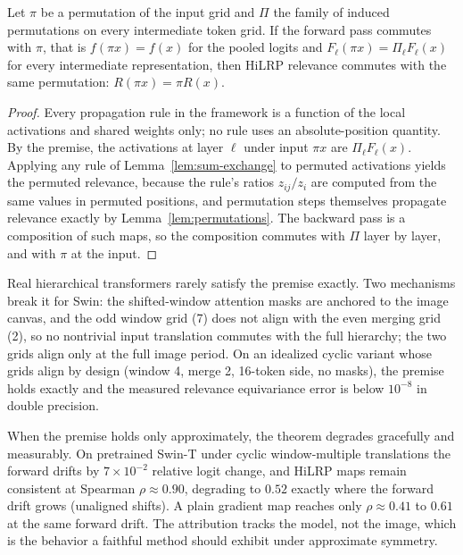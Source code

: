 \begin{theorem}
\label{thm:equivariance}
Let $\pi$ be a permutation of the input grid and $\Pi$ the family of induced
permutations on every intermediate token grid. If the forward pass commutes
with $\pi$, that is $f(\pi x) = f(x)$ for the pooled logits and
$F_\ell(\pi x) = \Pi_\ell F_\ell(x)$ for every intermediate representation,
then HiLRP relevance commutes with the same permutation:
$R(\pi x) = \pi R(x)$.
\end{theorem}

\begin{proof}
Every propagation rule in the framework is a function of the local activations
and shared weights only; no rule uses an absolute-position quantity. By the
premise, the activations at layer $\ell$ under input $\pi x$ are
$\Pi_\ell F_\ell(x)$. Applying any rule of Lemma~\ref{lem:sum-exchange} to
permuted activations yields the permuted relevance, because the rule's ratios
$z_{ij}/z_i$ are computed from the same values in permuted positions, and
permutation steps themselves propagate relevance exactly by
Lemma~\ref{lem:permutations}. The backward pass is a composition of such maps,
so the composition commutes with $\Pi$ layer by layer, and with $\pi$ at the
input.
\end{proof}

\begin{remark}
\label{rem:premise}
Real hierarchical transformers rarely satisfy the premise exactly. Two
mechanisms break it for Swin: the shifted-window attention masks are anchored
to the image canvas, and the odd window grid (7) does not align with the even
merging grid (2), so no nontrivial input translation commutes with the full
hierarchy; the two grids align only at the full image period. On an idealized
cyclic variant whose grids align by design (window 4, merge 2, 16-token side,
no masks), the premise holds exactly and the measured relevance equivariance
error is below $10^{-8}$ in double precision.
\end{remark}

\begin{remark}
\label{rem:transfer}
When the premise holds only approximately, the theorem degrades gracefully and
measurably. On pretrained Swin-T under cyclic window-multiple translations the
forward drifts by $7{\times}10^{-2}$ relative logit change, and HiLRP maps
remain consistent at Spearman $\rho \approx 0.90$, degrading to $0.52$ exactly
where the forward drift grows (unaligned shifts). A plain gradient map reaches
only $\rho \approx 0.41$ to $0.61$ at the same forward drift. The attribution
tracks the model, not the image, which is the behavior a faithful method
should exhibit under approximate symmetry.
\end{remark}

